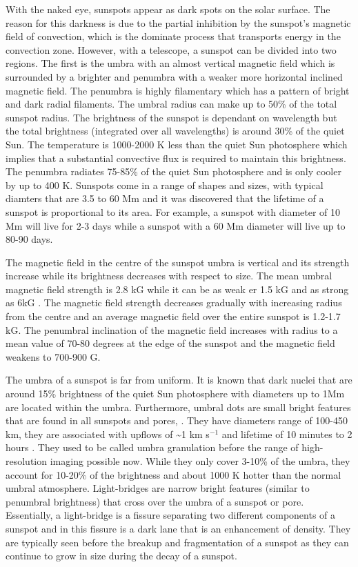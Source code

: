 	With the naked eye, sunspots appear as dark spots on the solar surface.
	The reason for this darkness is due to the partial inhibition by the sunspot's magnetic field of convection, which is the dominate process that transports energy in the convection zone.
	However, with a telescope, a sunspot can be divided into two regions.
	The first is the umbra with an almost vertical magnetic field which is surrounded by a brighter and penumbra with a weaker more horizontal inclined magnetic field.
	The penumbra is highly filamentary which has a pattern of bright and dark radial filaments.
	The umbral radius can make up to 50\% of the total sunspot radius.
	The brightness of the sunspot is dependant on wavelength but the total brightness (integrated over all wavelengths) is around 30\% of the quiet Sun.
	The temperature is 1000-2000 K less than the quiet Sun photosphere which implies that a substantial convective flux is required to maintain this brightness.
	The penumbra radiates 75-85\% of the quiet Sun photosphere and is only cooler by up to 400 K.
	Sunspots come in a range of shapes and sizes, with typical diamters that are 3.5 to 60 Mm and it was discovered that the lifetime of a sunspot is proportional to its area. 
	For example, a sunspot with diameter of 10 Mm will live for 2-3 days while a sunspot with a 60 Mm diameter will live up to 80-90 days.
	
	The magnetic field in the centre of the sunspot umbra is vertical and its strength increase while its brightness decreases with respect to size.
	The mean umbral magnetic field strength is 2.8 kG while it can be as weak er 1.5 kG and as strong as 6kG \citep{2006SoPh..239...41L}.
	The magnetic field strength decreases gradually with increasing radius from the centre and an average magnetic field over the entire sunspot is 1.2-1.7 kG.
	The penumbral inclination of the magnetic field increases with radius to a mean value of 70-80 degrees at the edge of the sunspot and the magnetic field weakens to 700-900 G.

	The umbra of a sunspot is far from uniform.
	It is known that dark nuclei that are around 15\% brightness of the quiet Sun photosphere with diameters up to 1Mm are located within the umbra.
	Furthermore, umbral dots are small bright features that are found in all sunspots and pores, \cite{1950Obs....70..234T,1964ApJ...139...45D}.
	They have diameters range of 100-450 km, they are associated with upflows of \textasciitilde1 km s$^{-1}$ and lifetime of 10 minutes to 2 hours \citep{1997A&A...328..682S,1997A&A...328..689S}.
	They used to be called umbra granulation before the range of high-resolution imaging possible now.
	While they only cover 3-10\% of the umbra, they account for 10-20\% of the brightness and about 1000 K hotter than the normal umbral atmosphere.
	Light-bridges are narrow bright features (similar to penumbral brightness) that cross over the umbra of a sunspot or pore.
	Essentially, a light-bridge is a fissure separating two different components of a sunspot and in this fissure is a dark lane that is an enhancement of density.
	They are typically seen before the breakup and fragmentation of a sunspot as they can continue to grow in size during the decay of a sunspot.
	
